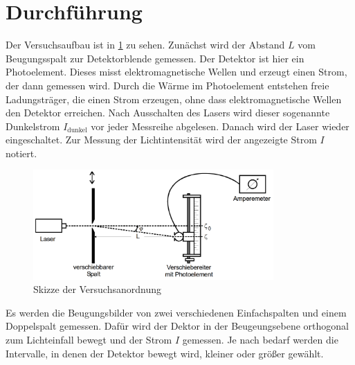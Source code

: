 \section{Durchführung}
\label{sec:Durchführung}

Der Versuchsaufbau ist in \ref{fig:aufbau} zu sehen. Zunächst wird der Abstand $L$
vom Beugungsspalt zur Detektorblende gemessen. Der Detektor ist hier ein Photoelement.
Dieses misst elektromagnetische Wellen und erzeugt einen Strom, der dann gemessen wird.
Durch die Wärme im Photoelement entstehen freie Ladungsträger, die einen Strom erzeugen,
ohne dass elektromagnetische Wellen den Detektor erreichen. Nach Ausschalten des Lasers
wird dieser sogenannte Dunkelstrom $I_\text{dunkel}$ vor jeder Messreihe abgelesen.
Danach wird der Laser wieder eingeschaltet. Zur Messung der Lichtintensität wird der
angezeigte Strom $I$ notiert.

\begin{figure}
  \centering
  \includegraphics[width=260pt]{data/aufbau.png}
  \caption{Skizze der Versuchsanordnung \cite{Versuchsanleitung}}
  \label{fig:aufbau}
\end{figure}

Es werden die Beugungsbilder von zwei verschiedenen Einfachspalten und einem Doppelspalt
gemessen. Dafür wird der Dektor in der Beugeungsebene orthogonal zum Lichteinfall
bewegt und der Strom $I$ gemessen. Je nach bedarf werden die Intervalle, in denen der
Detektor bewegt wird, kleiner oder größer gewählt.
